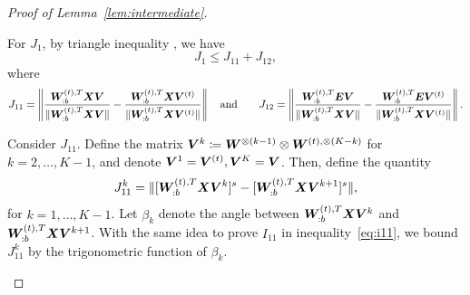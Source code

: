 \documentclass[lettersize,onecolumn,journal]{IEEEtran}
\theoremstyle{definition}
\theoremstyle{definition}
\def\fixme#1#2{\textbf{\color{red}[FIXME (#1): #2]}}
\begin{document}
\begin{proof}[Proof of Lemma~\ref{lem:intermediate}]
\begin{enumerate}
    For $J_1$, by triangle inequality 
    , we have 
    \begin{equation}
        J_1 \leq J_{11} + J_{12},
    \end{equation}
    where 
    \begin{equation}
        J_{11} =  \left\lVert \frac{\bm{W}_{:b}^{(t),T} \bm X \bm{V} }{\lVert \bm{W}_{:b}^{(t),T} \bm X \bm{V} \rVert} - \frac{\bm{W}_{:b}^{(t),T} \bm X \bm{V}^{(t)} }{\lVert \bm{W}_{:b}^{(t),T} \bm X \bm{V}^{(t)} \rVert}  \right\rVert \quad \text{and} \quad \quad J_{12} =  \left\lVert \frac{\bm{W}_{:b}^{(t),T}  \bm{E} \bm{V}}{ \lVert\bm{W}_{:b}^{(t),T}  \bm X \bm{V}\rVert } - \frac{\bm{W}_{:b}^{(t),T}  \bm{E} \bm{V}^{(t)}}{ \lVert\bm{W}_{:b}^{(t),T}  \bm X \bm{V}^{(t)}\rVert }   \right\rVert.
    \end{equation}
    
    
    Consider $J_{11}$.  Define the matrix $\bm{V}^{k} \coloneqq \bm{W}^{\otimes (k-1)} \otimes \bm{W}^{(t), \otimes (K-k)}$ for $k = 2,\ldots, K-1$, and denote $\bm{V}^1 = \bm{V}^{(t)}, \bm{V}^K = \bm{V}$. Then, define the quantity
    \begin{equation}
        J_{11}^k = \lVert [\bm{W}_{:b}^{(t),T} \bm X \bm{V}^k ]^s - [\bm{W}_{:b}^{(t),T} \bm X \bm{V}^{k+1} ]^s \rVert,
     \end{equation}
    for $k = 1,\ldots, K-1$. Let $\beta_k$ denote the angle between $\bm{W}_{:b}^{(t),T} \bm X \bm{V}^k$ and $\bm{W}_{:b}^{(t),T} \bm X \bm{V}^{k+1}$. With the same idea to prove $I_{11}$ in inequality~\eqref{eq:i11}, we bound $J_{11}^k$ by the trigonometric function of $\beta_k$. 
    

\end{enumerate}
\end{proof}
\end{document}
